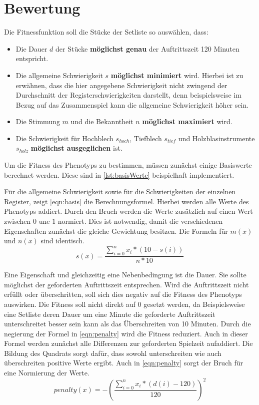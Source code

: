 \section{Bewertung}\label{sec:fitness}
Die Fitnessfunktion soll die Stücke der Setliste so auswählen, dass:
\begin{itemize}
    \item Die Dauer $d$ der Stücke \textbf{möglichst genau} der Auftrittszeit 120 Minuten entspricht.
    \item Die allgemeine Schwierigkeit $s$ \textbf{möglichst minimiert} wird. Hierbei ist zu erwähnen, dass die hier
        angegebene Schwierigkeit nicht zwingend der Durchschnitt der Registerschwierigkeiten darstellt, denn
        beispielsweise im Bezug auf das Zusammenspiel kann die allgemeine Schwierigkeit höher sein.
    \item Die Stimmung $m$ und die Bekanntheit $n$ \textbf{möglichst maximiert} wird.
    \item Die Schwierigkeit für Hochblech $s_{hoch}$, Tiefblech $s_{tief}$ und Holzblasinstrumente $s_{holz}$ \textbf{möglichst ausgeglichen} ist.
\end{itemize}
Um die Fitness des Phenotyps zu bestimmen, müssen zunächst einige Basiswerte berechnet werden. Diese sind in \autoref{lst:basisWerte} beispielhaft implementiert.

Für die allgemeine Schwierigkeit sowie für die Schwierigkeiten der einzelnen Register, zeigt \autoref{eqn:basis} die Berechnungsformel. Hierbei werden alle Werte des
Phenotyps addiert. Durch den Bruch werden die Werte zusätzlich auf einen Wert zwischen $0$ une $1$ normiert. Dies ist notwendig, 
damit die verschiedenen Eigenschaften zunächst die gleiche Gewichtung besitzen. 
Die Formeln für $m(x)$ und $n(x)$ sind identisch.
\begin{equation}
    s(x) = \frac{\sum_{i=0}^{n} x_i * (10 - s(i)) }{n * 10}
    \label{eqn:basis}
\end{equation}

Eine Eigenschaft und gleichzeitig eine Nebenbedingung ist die Dauer. Sie sollte möglichst der geforderten Auftrittszeit entsprechen. Wird die Auftrittszeit nicht erfüllt
oder überschritten, soll sich dies negativ auf die Fitness des Phenotyps auswirken. Die Fitness soll nicht direkt auf 0 gesetzt werden, da
Beispielsweise eine Setliste deren Dauer um eine Minute die geforderte Auftrittszeit unterschreitet besser sein kann als das Überschreiten von 10 Minuten.
Durch die negierung der Formel in \autoref{eqn:penalty} wird die Fitness reduziert. Auch in dieser Formel werden zunächst alle Differenzen zur geforderten
Spielzeit aufaddiert. Die Bildung des Quadrats sorgt dafür, dass sowohl unterschreiten wie auch überschreiten
positive Werte ergibt.
Auch in \autoref{eqn:penalty} sorgt der Bruch für eine Normierung der Werte.
\begin{equation}
    penalty(x) = -\left( \frac{\sum_{i=0}^{n}x_i * (d(i)-120)}{120}\right)^2
    \label{eqn:penalty}
\end{equation}

